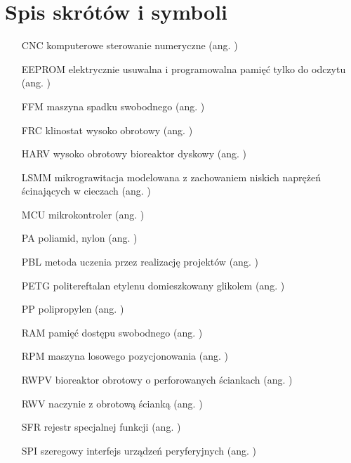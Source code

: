 \chapter*{Spis skrótów i symboli}

\begin{itemize}
	
	\item[CNC] komputerowe sterowanie numeryczne ({ang. })
	\item[EEPROM] elektrycznie usuwalna i programowalna pamięć tylko do odczytu ({ang. })
	\item[FFM] maszyna spadku swobodnego ({ang. })
	\item[FRC] klinostat wysoko obrotowy  ({ang. })
	\item[HARV] wysoko obrotowy bioreaktor dyskowy   ({ang. })
	\item[LSMM] mikrograwitacja modelowana z zachowaniem niskich naprężeń ścinających w cieczach  (ang. )
	\item[MCU] mikrokontroler (ang. )
	\item[PA] poliamid, nylon ({ang. })
	\item[PBL] metoda uczenia przez realizację projektów   ({ang. })
	\item[PETG] politereftalan etylenu domieszkowany glikolem  ({ang. })
	\item[PP] polipropylen ({ang. })
	\item[RAM] pamięć dostępu swobodnego ({ang. })
	\item[RPM] maszyna losowego pozycjonowania ({ang. })
	\item[RWPV] bioreaktor obrotowy o perforowanych ściankach ({ang. })
	\item[RWV] naczynie z obrotową ścianką  ({ang. })
	\item[SFR] rejestr specjalnej funkcji ({ang. })
	\item[SPI] szeregowy interfejs urządzeń peryferyjnych ({ang. })

\end{itemize}
